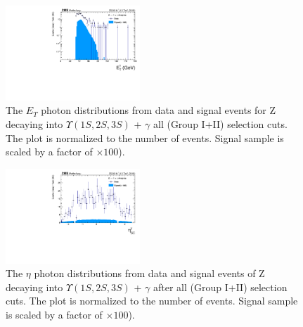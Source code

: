 \begin{figure}[!htbp]
\begin{center}
\includegraphics[width=0.45\textwidth]{figures_and_tables/outputPlots/ZtoUpsilon_Cat0_ZZZZZ/nEvts/data_x_mc/withKinCuts/h_withKin_Photon_pt}\hspace*{1.cm}
\end{center}\vspace*{-.5cm}
\caption{The $E_{T}$ photon distributions from data and signal events for Z decaying into $\Upsilon(1S,2S,3S)$ + $\gamma$ all (Group I+II) selection cuts. The plot is normalized to the number of events. Signal sample is scaled by a factor of $\times 100$).}
\label{fig:pTPhoton_ZtoUpsilon_Cat0_groupI_plus_II}
\end{figure}


\begin{figure}[!htbp]
\begin{center}
\includegraphics[width=0.45\textwidth]{figures_and_tables/outputPlots/ZtoUpsilon_Cat0_ZZZZZ/nEvts/data_x_mc/withKinCuts/h_withKin_Photon_eta}\hspace*{1.cm}
\end{center}\vspace*{-.5cm}
\caption{The $\eta$ photon distributions from data and signal events of Z decaying into $\Upsilon(1S,2S,3S)$ + $\gamma$ after all (Group I+II) selection cuts. The plot is normalized to the number of events. Signal sample is scaled by a factor of $\times 100$).}
\label{fig:etaPhoton_ZtoUpsilon_Cat0_groupI_plus_II}
\end{figure}

